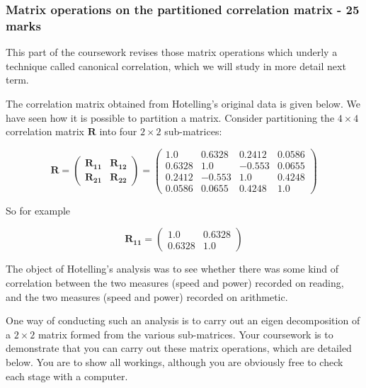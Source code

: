 \documentclass[11pt]{article}
\begin{document}
\subsubsection{Matrix operations on the partitioned correlation matrix - 25 marks}

This part of the coursework revises those matrix operations which underly a technique called canonical correlation, which we will study in more detail next term.

The correlation matrix obtained from Hotelling's original data is given below.  We have seen how it is possible to partition a matrix.   Consider partitioning the $4 \times 4$ correlation matrix $\boldsymbol{R}$ into four $2 \times 2$ sub-matrices: 

\begin{displaymath}
\boldsymbol{R} = \left( \begin{array}{l|l} \boldsymbol{R_{11}} & \boldsymbol{R_{12}} \\ \hline    \boldsymbol{R_{21}} & \boldsymbol{R_{22}} \end{array} \right) = 
\left( \begin{array}{ll|ll} 1.0 & 0.6328 & 0.2412 & 0.0586 \\
0.6328 & 1.0 & -0.553 & 0.0655 \\
\hline
0.2412 & -0.553 & 1.0 & 0.4248 \\
0.0586 & 0.0655 & 0.4248 & 1.0
\end{array} \right)
\end{displaymath}


So for example 

\begin{displaymath}
\boldsymbol{R_{11}} = \left( \begin{array}{ll} 1.0 & 0.6328\\
0.6328 & 1.0 
\end{array} 
\right)
\end{displaymath}



The object of Hotelling's analysis was to see whether there was some kind of correlation between the two measures (speed and power) recorded on reading, and the two measures (speed and power) recorded on arithmetic.   


One way of conducting such an analysis is to carry out an eigen decomposition of a $2 \times 2$ matrix formed from the various sub-matrices.   Your coursework is to demonstrate that you can carry out these matrix operations, which are detailed below.   You are to show all workings, although you are obviously free to check each stage with a computer.
\end{document}
